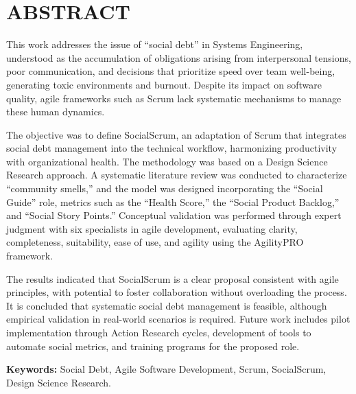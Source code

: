 \chapter*{ABSTRACT}

This work addresses the issue of ``social debt'' in Systems Engineering, understood as the accumulation of obligations arising from interpersonal tensions, poor communication, and decisions that prioritize speed over team well-being, generating toxic environments and burnout. Despite its impact on software quality, agile frameworks such as Scrum lack systematic mechanisms to manage these human dynamics.

The objective was to define SocialScrum, an adaptation of Scrum that integrates social debt management into the technical workflow, harmonizing productivity with organizational health. The methodology was based on a Design Science Research approach. A systematic literature review was conducted to characterize ``community smells,'' and the model was designed incorporating the ``Social Guide'' role, metrics such as the ``Health Score,'' the ``Social Product Backlog,'' and ``Social Story Points.'' Conceptual validation was performed through expert judgment with six specialists in agile development, evaluating clarity, completeness, suitability, ease of use, and agility using the AgilityPRO framework.

The results indicated that SocialScrum is a clear proposal consistent with agile principles, with potential to foster collaboration without overloading the process. It is concluded that systematic social debt management is feasible, although empirical validation in real-world scenarios is required. Future work includes pilot implementation through Action Research cycles, development of tools to automate social metrics, and training programs for the proposed role.

\textbf{Keywords:} Social Debt, Agile Software Development, Scrum, SocialScrum, Design Science Research.